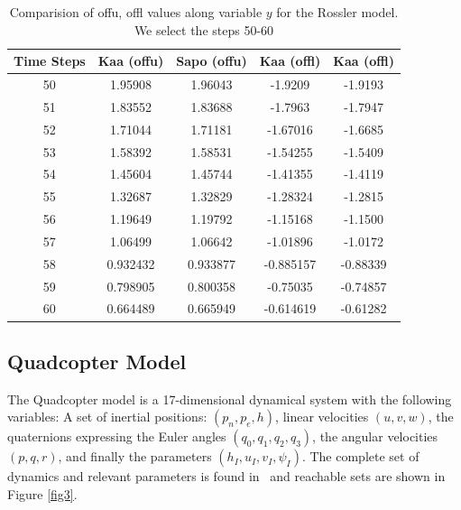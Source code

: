 \documentclass[EPiC]{easychair}
\begin{document}
\begin{table}[hbt!]
\centering
\begin{tabular}{|c| c c c c|}
    \hline
    {\bf Time Steps } & {\bf Kaa (offu) } & {\bf Sapo (offu) } & {\bf Kaa (offl) } & {\bf Kaa (offl) }  \\
    \hline
    50 & 1.95908 & 1.96043  & -1.9209 & -1.9193 \\

    51 & 1.83552 & 1.83688  & -1.7963 & -1.7947 \\
    
    52 & 1.71044 & 1.71181  & -1.67016 & -1.6685 \\
  
    53 & 1.58392 & 1.58531  & -1.54255 & -1.5409 \\
   
    54 & 1.45604 & 1.45744  & -1.41355 & -1.4119 \\
 
    55 & 1.32687 & 1.32829  & -1.28324 & -1.2815\\

    56 & 1.19649 & 1.19792  & -1.15168 & -1.1500\\

    57 & 1.06499 & 1.06642  & -1.01896 & -1.0172 \\
 
    58 & 0.932432 & 0.933877 & -0.885157 & -0.88339 \\
    
    59 & 0.798905 & 0.800358  & -0.75035 &  -0.74857 \\
  
    60 & 0.664489 & 0.665949  & -0.614619 & -0.61282\\
    \hline
\end{tabular}
\caption{Comparision of offu, offl values along variable $y$ for the Rossler model. We select the steps 50-60}
\label{val2}
\end{table}

\subsection{Quadcopter Model}
\noindent The Quadcopter model is a 17-dimensional dynamical system with the following variables:
A set of inertial positions: $(p_n,p_e,h)$, linear velocities $(u,v,w)$, the quaternions expressing the Euler angles $(q_0,q_1,q_2,q_3)$, the angular velocities $(p,q,r)$, and finally the parameters $(h_I, u_I, v_I, \psi_I)$. The complete set of dynamics and relevant parameters is found in~\cite{dreossi2017reachability} and reachable sets are shown in Figure \ref{fig3}.
\end{document}
